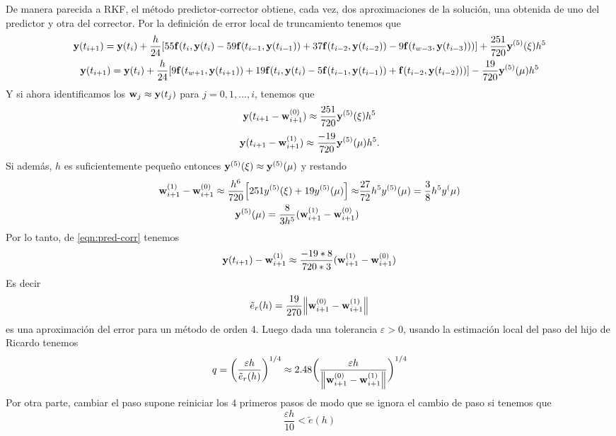 De manera parecida a RKF, %
el método predictor-corrector obtiene, cada vez,
dos aproximaciones de la solución,
una obtenida de uno del predictor y otra del corrector.
Por la definición de error local de truncamiento tenemos que
\begin{gather*}
    \vb{y}{}(t_{i+1}) = \vb{y}{}(t_i) + \frac{h}{24}[
        55\vb{f}{}(t_i,\vb{y}{}(t_i) - 59\vb{f}{}(t_{i-1},\vb{y}{}(t_{i-1})) + 37\vb{f}{}(t_{i-2}, \vb{y}{}(t_{i-2}))
        - 9\vb{f}{}(t_{w-3},\vb{y}{}(t_{i-3})))
    ] + \frac{251}{720}\vb{y}{}^{(5)}(\xi)h^5  \\
    \vb{y}{}(t_{i+1}) = \vb{y}{}(t_i) + \frac{h}{24}[
        9\vb{f}{}(t_{w+1},\vb{y}{}(t_{i+1})) + 19\vb{f}{}(t_i,\vb{y}{}(t_i) - 5\vb{f}{}(t_{i-1},\vb{y}{}(t_{i-1}))
        + \vb{f}{}(t_{i-2}, \vb{y}{}(t_{i-2})))
    ] - \frac{19}{720}\vb{y}{}^{(5)}(\mu)h^5
\end{gather*}
Y si ahora identificamos los $\vb{w}{}_j \approx \vb{y}{}(t_j)$ para $j = 0,1,\dots, i$,
tenemos que
\begin{equation*} 
    \vb{y}{}(t_{i+1} - \vb{w}{}_{i+1}^{(0)}) \approx {} 
        \frac{251}{720}\vb{y}{}^{(5)}(\xi)h^5
\end{equation*}
\begin{equation} \label{eqn:pred-corr}
    \vb{y}{}(t_{i+1} - \vb{w}{}_{i+1}^{(1)}) \approx {} 
        \frac{-19}{720}\vb{y}{}^{(5)}(\mu)h^5.
\end{equation}
Si además, $h$ es suficientemente pequeño entonces
$\vb{y}{}^{(5)}(\xi) \approx \vb{y}{}^{(5)}(\mu)$
y restando
\begin{align*}
    \vb{w}{}_{i+1}^{(1)} - \vb{w}{}_{i+1}^{(0)} \approx 
        \frac{h^6}{720}\qty[251y^{(5)}(\xi) + 19y^{(5)}(\mu)] \approx &
        \frac{27}{72}h^5y^{(5)}(\mu) = \frac{3}{8}h^5y^(\mu) \\
    \vb{y}{}^{(5)}(\mu) = \frac{8}{3h^5}(\vb{w}{}_{i+1}^{(1)} - \vb{w}{}_{i+1}^{(0)}) &
\end{align*}
Por lo tanto, de \ref{eqn:pred-corr} tenemos
\begin{equation*}
    \vb{y}{}(t_{i+1}) - \vb{w}{}_{i+1}^{(1)} \approx \frac{-19 * 8}{720 * 3}(\vb{w}{}_{i+1}^{(1)} - \vb{w}{}_{i+1}^{(0)})
\end{equation*}
Es decir
\begin{equation*}
    \tilde{e}_r(h) = \frac{19}{270}\norm{\vb{w}{}_{i+1}^{(0)} - \vb{w}{}_{i+1}^{(1)}}   
\end{equation*}
es una aproximación del error para un método de orden 4.
Luego dada una tolerancia $\varepsilon > 0$, usando la estimación
local del paso del hijo de Ricardo tenemos
\begin{equation*}
    q = \bigg(\frac{\varepsilon h}{\tilde{e}_r(h)}\bigg)^{1/4} \approx 
        2.48\bigg(\frac{\varepsilon h}{\norm{\vb{w}{}_{i+1}^{(0)} - \vb{w}{}_{i+1}^{(1)}}}\bigg)^{1/4}
\end{equation*}
Por otra parte, cambiar el paso supone reiniciar los
$4$ primeros pasos de modo que se ignora el cambio de paso 
si tenemos que 
\begin{equation*}
    \frac{\varepsilon h}{10} < \tilde{e}(h)
\end{equation*}
